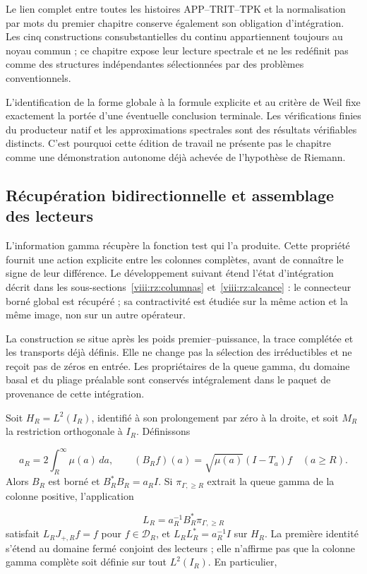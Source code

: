 Le lien complet entre toutes les histoires APP–TRIT–TPK et la normalisation par mots du premier chapitre conserve également son obligation d’intégration. Les cinq constructions consubstantielles du continu appartiennent toujours au noyau commun ; ce chapitre expose leur lecture spectrale et ne les redéfinit pas comme des structures indépendantes sélectionnées par des problèmes conventionnels.

L'identification de la forme globale à la formule explicite et au critère de Weil fixe exactement la portée d'une éventuelle conclusion terminale. Les vérifications finies du producteur natif et les approximations spectrales sont des résultats vérifiables distincts. C'est pourquoi cette édition de travail ne présente pas le chapitre comme une démonstration autonome déjà achevée de l'hypothèse de Riemann.

\subsection{Récupération bidirectionnelle et assemblage des lecteurs}
\label{viii:rz:gamma}
L’information gamma récupère la fonction test qui l’a produite. Cette propriété fournit une action explicite entre les colonnes complètes, avant de connaître le signe de leur différence. Le développement suivant étend l’état d’intégration décrit dans les sous-sections~\ref{viii:rz:columnas} et~\ref{viii:rz:alcance} : le connecteur borné global est récupéré ; sa contractivité est étudiée sur la même action et la même image, non sur un autre opérateur.

La construction se situe après les poids premier–puissance, la trace complétée et les transports déjà définis. Elle ne change pas la sélection des irréductibles et ne reçoit pas de zéros en entrée. Les propriétaires de la queue gamma, du domaine basal et du pliage préalable sont conservés intégralement dans le paquet de provenance de cette intégration.

Soit \(H_R=L^2(I_R)\), identifié à son prolongement par zéro à la droite, et soit \(M_R\) la restriction orthogonale à \(I_R\). Définissons

\[
a_R=2\int_R^\infty\mu(a)\,da,\qquad
(B_Rf)(a)=\sqrt{\mu(a)}(I-T_a)f\quad(a\geq R).
\]
Alors \(B_R\) est borné et \(B_R^*B_R=a_RI\). Si \(\pi_{\Gamma,\geq R}\) extrait la queue gamma de la colonne positive, l’application

\[
L_R=a_R^{-1}B_R^*\pi_{\Gamma,\geq R}
\]
satisfait \(L_RJ_{+,R}f=f\) pour \(f\in\mathcal D_R\), et \(L_RL_R^*=a_R^{-1}I\) sur \(H_R\). La première identité s’étend au domaine fermé conjoint des lecteurs ; elle n’affirme pas que la colonne gamma complète soit définie sur tout \(L^2(I_R)\). En particulier,

